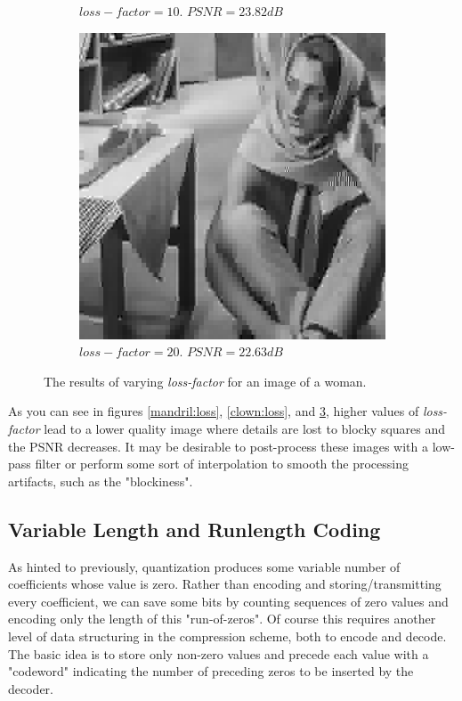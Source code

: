 \documentclass[11pt,a4paper]{article}
\begin{document}
\begin{figure}[ht]
\begin{subfigure}[h]{0.4\textwidth}
		\caption{$loss-factor = 10$. $PSNR = 23.82dB$}
		\label{barbara:10}
	\end{subfigure}
	\par\bigskip
	\begin{subfigure}[h]{0.4\textwidth}
		\includegraphics[width=\textwidth]{barbara_lf20}
		\caption{$loss-factor = 20$. $PSNR = 22.63dB$}
		\label{barbara:20}
	\end{subfigure}
	\caption{The results of varying \textit{loss-factor} for an image of a woman.}
	\label{barbara:loss}
\end{figure}
	
\clearpage

As you can see in figures \ref{mandril:loss}, \ref{clown:loss}, and \ref{barbara:loss}, higher values of \textit{loss-factor} lead to a lower quality image where details are lost to blocky squares and the PSNR decreases. It may be desirable to post-process these images with a low-pass filter or perform some sort of interpolation to smooth the processing artifacts, such as the "blockiness".

\subsection{Variable Length and Runlength Coding}
As hinted to previously, quantization produces some variable number of coefficients whose value is zero. Rather than encoding and storing/transmitting every coefficient, we can save some bits by counting sequences of zero values and encoding only the length of this "run-of-zeros". Of course this requires another level of data structuring in the compression scheme, both to encode and decode. The basic idea is to store only non-zero values and precede each value with a "codeword" indicating the number of preceding zeros to be inserted by the decoder.
\end{document}

